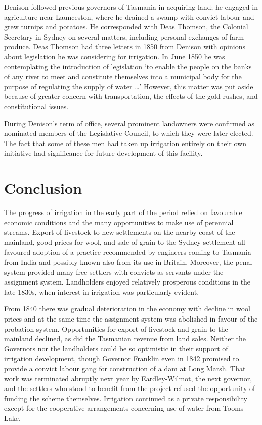 Denison followed previous governors of Tasmania in acquiring land; he
engaged in agriculture near Launceston, where he drained a swamp with
convict labour and grew turnips and potatoes.  He corresponded with
Deas Thomson, the Colonial Secretary in Sydney on several matters,
including personal exchanges of farm produce.  Deas Thomson had three
letters in 1850 from Denison with opinions about legislation he was
considering for irrigation.  In June 1850 he was contemplating the
introduction of legislation `to enable the people on the banks of any
river to meet and constitute themselves into a municipal body for the
purpose of regulating the supply of water
\ldots' However, this matter was put aside because of greater concern with
transportation, the effects of the gold rushes, and constitutional
issues.

During Denison's term of office, several prominent landowners were
confirmed as nominated members of the Legislative Council, to which
they were later elected.  The fact that some of these men had taken up
irrigation entirely on their own initiative had significance for
future development of this facility.

\section*{Conclusion}

The progress of irrigation in the early part of the period relied on
favourable economic conditions and the many opportunities to make use
of perennial streams.  Export of livestock to new settlements on the
nearby coast of the mainland, good prices for wool, and sale of grain
to the Sydney settlement all favoured adoption of a practice
recommended by engineers coming to Tasmania from India and possibly
known also from its use in Britain.  Moreover, the penal system
provided many free settlers with convicts as servants under the
assignment system.  Landholders enjoyed relatively prosperous
conditions in the late 1830s, when interest in irrigation was
particularly evident.

From 1840 there was gradual deterioration in the economy with decline
in wool prices and at the same time the assignment system was
abolished in favour of the probation system.  Opportunities for export
of livestock and grain to the mainland declined, as did the Tasmanian
revenue from land sales.  Neither the Governors nor the landholders
could be so optimistic in their support of irrigation development,
though Governor Franklin even in 1842 promised to provide a convict
labour gang for construction of a dam at Long Marsh.  That work was
terminated abruptly next year by Eardley-Wilmot, the next governor,
and the settlers who stood to benefit from the project refused the
opportunity of funding the scheme themselves.  Irrigation continued as
a private responsibility except for the cooperative arrangements
concerning use of water from Tooms Lake.

